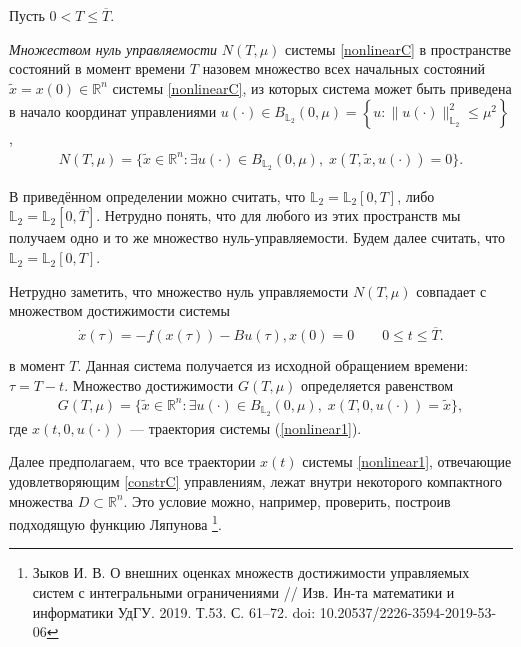 \documentclass[../main.tex]{subfiles}
\begin{document}
Пусть $ 0 <  T \leqslant \overline{T} $.
\begin{definition}
	{\it Множеством нуль управляемости} $ N(T,\mu) $ системы \eqref{nonlinearC}  в  пространстве состояний в момент времени $ T $ назовем
	множество всех начальных состояний $ \widetilde{x}=x(0) \in \mathbb{R}^n $ системы \eqref{nonlinearC},  из которых система может быть приведена в начало координат управлениями
	$ u(\cdot) \in B_{\mathbb{L}_2}(0,\mu)  =\left\lbrace u:\lVert u(\cdot)\rVert^2_{\mathbb{L}_2} \leqslant \mu^2\right\rbrace  $,
	\begin{gather*}
		N(T,\mu)=\{\widetilde{x}\in \mathbb{R}^n:\exists u(\cdot)\in B_{\mathbb{L}_2}(0,\mu),\; x( T,\widetilde{x},u(\cdot)) = 0\}.
	\end{gather*}
\end{definition}

В приведённом определении можно считать, что $ \mathbb{L}_2 =\mathbb{L}_2[0,T] $, либо  $ \mathbb{L}_2 =\mathbb{L}_2[0,\overline{T}] $. Нетрудно понять, что для любого из этих пространств мы получаем одно и то же множество нуль-управляемости. Будем далее считать, что $ \mathbb{L}_2 =\mathbb{L}_2[0,T] $.

Нетрудно заметить, что множество нуль управляемости $N(T,\mu)$ 
совпадает с множеством достижимости системы 
\begin{gather}\label{nonlinear1}
	\begin{gathered}
		\dot{x}(\tau)=-f(x(\tau))-B u(\tau), x(0)=0 \qquad 0 \leqslant t \leqslant   \overline{T}. \\
	\end{gathered}
\end{gather}
в момент $T$. Данная система получается из исходной обращением времени: $\tau=T-t$.  Множество достижимости $G(T,\mu)$ определяется равенством 
\begin{gather*}
		G(T,\mu)=\{\widetilde{x}\in \mathbb{R}^n:\exists u(\cdot)\in B_{\mathbb{L}_2}(0,\mu),\; x( T,0,u(\cdot)) = \widetilde{x}\},
		\end{gather*}
где  $x( t,0,u(\cdot))$	--- траектория системы (\ref{nonlinear1}).	
		
Далее предполагаем, что все траектории $ x(t) $ системы \eqref{nonlinear1}, отвечающие удовлетворяющим \eqref{constrC} управлениям,  лежат внутри некоторого компактного множества $ D \subset \mathbb{R}^n $. Это условие можно, например, проверить, построив подходящую функцию Ляпунова \footnote{Зыков И. В. О внешних оценках множеств достижимости управляемых систем с интегральными ограничениями  // Изв. Ин-та математики и информатики УдГУ. 2019. Т.53. С. 61–72.  doi: 10.20537/2226-3594-2019-53-06}.
\end{document}
